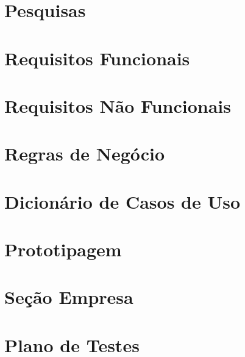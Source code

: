 \documentclass[
	article,			%
	12pt,				%
	oneside,			%
	a4paper,			%
    BIBLATEX,           %
	english,			%
	brazil,				%
	sumario=tradicional
	]{abntex2}
\begin{document}
\postextual



\newpage


\newpage
\begin{apendicesenv}

\chapter{Pesquisas\label{pesquisas}}



\newpage

\chapter{Requisitos Funcionais\label{requisitos_f}}



\newpage

\chapter{Requisitos Não Funcionais\label{requisitos_nf}}



\newpage

\chapter{Regras de Negócio\label{regras_negocio}}



\newpage

\chapter{Dicionário de Casos de Uso\label{dicionario_casos_uso}}



\newpage

\chapter{Prototipagem\label{prototipagem}}


\newpage

\chapter{Seção Empresa \label{secao_empresa}}


\chapter{Plano de Testes \label{plano_testes}}


\end{apendicesenv}
\end{document}
